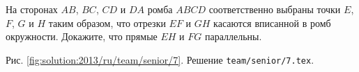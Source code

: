 \problem{}
На сторонах $AB$, $BC$, $CD$ и $DA$ ромба $ABCD$ соответственно выбраны точки
$E$, $F$, $G$ и $H$ таким образом, что отрезки $EF$ и $GH$ касаются вписанной в
ромб окружности.
Докажите, что прямые $EH$ и $FG$ параллельны.

%
\label{solution:2013/ru/team/senior/7}
Рис. \ref{fig:solution:2013/ru/team/senior/7}.
Решение \texttt{team/senior/7.tex}.
\endproblem
